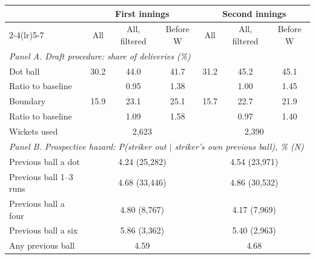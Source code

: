 \begin{tabular}{lcccccc}
\toprule
 & \multicolumn{3}{c}{First innings} & \multicolumn{3}{c}{Second innings} \\
\cmidrule(lr){2-4}\cmidrule(lr){5-7}
 & All & All, filtered & Before W & All & All, filtered & Before W \\
\midrule
\multicolumn{7}{l}{\emph{Panel A. Draft procedure: share of deliveries (\%)}} \\
Dot ball & 30.2 & 44.0 & 41.7 & 31.2 & 45.2 & 45.1 \\
\quad Ratio to baseline & & 0.95 & 1.38 & & 1.00 & 1.45 \\
Boundary & 15.9 & 23.1 & 25.1 & 15.7 & 22.7 & 21.9 \\
\quad Ratio to baseline & & 1.09 & 1.58 & & 0.97 & 1.40 \\
Wickets used & \multicolumn{3}{c}{2,623} & \multicolumn{3}{c}{2,390} \\
\midrule
\multicolumn{7}{l}{\emph{Panel B. Prospective hazard: P(striker out $\mid$ striker's own previous ball), \% (N)}} \\
Previous ball a dot & \multicolumn{3}{c}{4.24 (25,282)} & \multicolumn{3}{c}{4.54 (23,971)} \\
Previous ball 1--3 runs & \multicolumn{3}{c}{4.68 (33,446)} & \multicolumn{3}{c}{4.86 (30,532)} \\
Previous ball a four & \multicolumn{3}{c}{4.80 (8,767)} & \multicolumn{3}{c}{4.17 (7,969)} \\
Previous ball a six & \multicolumn{3}{c}{5.86 (3,362)} & \multicolumn{3}{c}{5.40 (2,963)} \\
Any previous ball & \multicolumn{3}{c}{4.59} & \multicolumn{3}{c}{4.68} \\
\bottomrule
\end{tabular}
